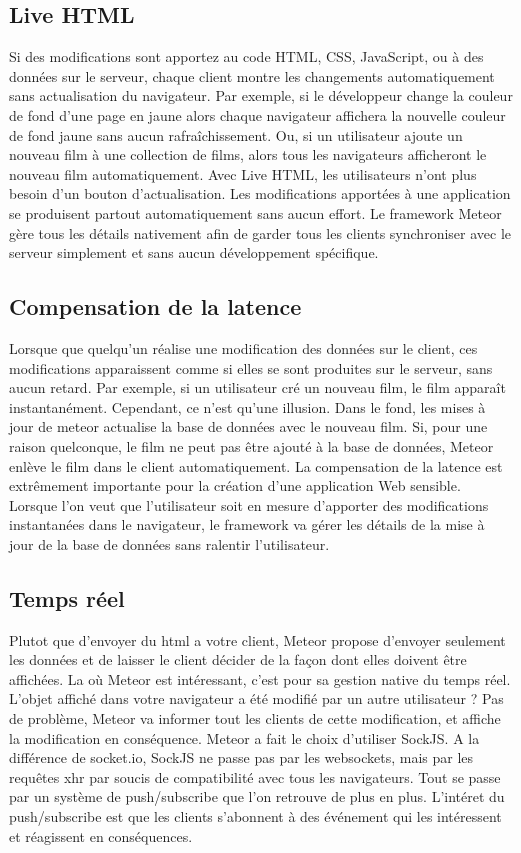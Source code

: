 \subsection{Live HTML}

Si des modifications sont apportez au code HTML, CSS, JavaScript, ou à des données sur le serveur, chaque client montre les changements automatiquement sans actualisation du navigateur. Par exemple, si le développeur change la couleur de fond d'une page en jaune alors chaque navigateur affichera la nouvelle couleur de fond jaune sans aucun rafraîchissement. Ou, si un utilisateur ajoute un nouveau film à une collection de films, alors tous les navigateurs afficheront le nouveau film automatiquement.
Avec Live HTML, les utilisateurs n'ont plus besoin d'un bouton d'actualisation. Les modifications apportées à une application se produisent partout automatiquement sans aucun effort. Le framework Meteor gère tous les détails nativement afin de garder tous les clients  synchroniser avec le serveur simplement et sans aucun développement spécifique.

\subsection{Compensation de la latence}
Lorsque que quelqu'un réalise une modification des données sur le client, ces modifications apparaissent comme si elles se sont produites sur le serveur, sans aucun retard. Par exemple, si un utilisateur cré un nouveau film, le film apparaît instantanément. Cependant, ce n'est qu'une illusion. Dans le fond, les mises à jour de meteor actualise la base de données avec le nouveau film. Si, pour une raison quelconque, le film ne peut pas être ajouté à la base de données, Meteor enlève le film dans le client automatiquement.
La compensation de la latence est extrêmement importante pour la création d'une application Web sensible. Lorsque l'on veut que l'utilisateur soit en mesure d'apporter des modifications instantanées dans le navigateur, le framework va gérer les détails de la mise à jour de la base de données sans ralentir l'utilisateur.

\subsection{Temps réel}


Plutot que d’envoyer du html a votre client, Meteor propose d’envoyer seulement les données et de laisser le client décider de la façon dont elles doivent être affichées. La où Meteor est intéressant, c’est pour sa gestion native du temps réel. L’objet affiché dans votre navigateur a été modifié par un autre utilisateur ? Pas de problème, Meteor va informer tout les clients de cette modification, et affiche la modification en conséquence. Meteor a fait le choix d’utiliser SockJS. A la différence de socket.io, SockJS ne passe pas par les websockets, mais par les requêtes xhr par soucis de compatibilité avec tous les navigateurs. Tout se passe par un système de push/subscribe que l’on retrouve de plus en plus. L’intéret du push/subscribe est que les clients s’abonnent à des événement qui les intéressent et réagissent en conséquences.

